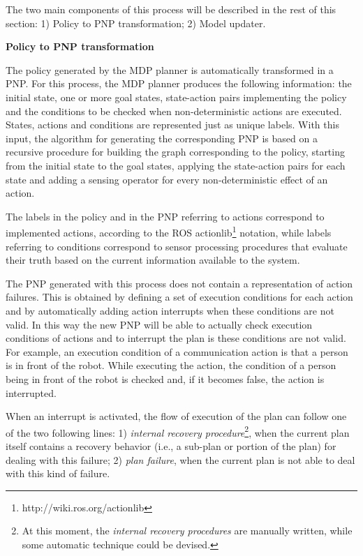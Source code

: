 The two main components of this process will be described in the rest of this section:
1) Policy to PNP transformation; 2) Model updater.

\vspace{1em}
\noindent
{\bf Policy to PNP transformation}

The policy generated by the MDP planner is automatically transformed in a PNP.
For this process, the MDP planner produces the following information: the initial state,
one or more goal states, state-action pairs implementing the policy and the conditions to
be checked when non-deterministic actions are executed. 
States, actions and conditions are represented just as unique labels.
With this input, the algorithm for generating the corresponding PNP is based on a recursive procedure for building the graph corresponding to the policy, starting from the initial state to the goal states, applying the state-action pairs for each state and adding a sensing operator for every non-deterministic effect of an action.

The labels in the policy and in the PNP referring to actions correspond to implemented actions, according to the ROS actionlib\footnote{http://wiki.ros.org/actionlib} notation,
while labels referring to conditions correspond to sensor processing procedures that
evaluate their truth based on the current information available to the system.

The PNP generated with this process does not contain a representation of action failures.
This is obtained by defining a set of execution conditions for each action and by automatically adding action interrupts when these conditions are not valid. In this way the new PNP will be able to actually check execution conditions of actions and to interrupt the plan is these conditions are not valid. For example, an execution condition of a communication action is that a person is in front of the robot. While executing the action, the condition of a person being in front of the robot is checked and, if it becomes false, the action is interrupted.

When an interrupt is activated, the flow of execution of the plan can follow one of the two following lines: 1) \emph{internal recovery procedure}\footnote{At this moment, the \emph{internal recovery procedures} are manually written, while some automatic technique could be devised.}, when the current plan itself contains a recovery behavior (i.e., a sub-plan or portion of the plan) for dealing with this failure; 2) \emph{plan failure}, when the current plan is not able to deal with this kind of failure.

